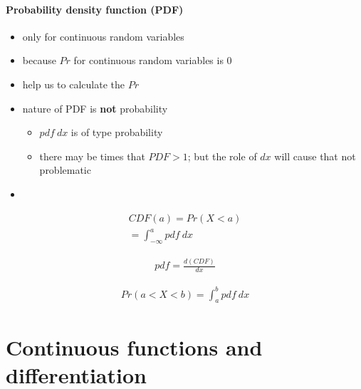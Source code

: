 \documentclass[a4paper]{article}
\begin{document}
\paragraph*{Probability density function (PDF)}{
    \begin{itemize}
        \item only for continuous random variables
        \item because $Pr$ for continuous random variables is $0$
        \item help us to calculate the $Pr$
        \item nature of PDF is \textbf{not} probability
            \begin{itemize}
                \item $pdf\ dx$ is of type probability
                \item there may be times that $PDF > 1$; but the role of $dx$
                will cause that not problematic
            \end{itemize}
        \item 
        
    \end{itemize}
}

\begin{align*}
    CDF(a) = Pr (X < a) \\
    = \int_{-\infty}^{a} pdf\ dx
\end{align*}

\begin{align*}
    pdf = \frac{d(CDF)}{dx}
\end{align*}

\begin{align*}
    Pr(a < X < b) = \int_{a}^{b} pdf\ dx
\end{align*}

\pagebreak

\section{Continuous functions and differentiation}
\end{document}
